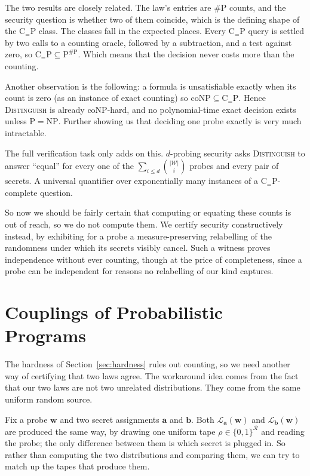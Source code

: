   The two results are closely related. The law's entries are $\#\mathrm{P}$
  counts, and the security question is whether two of them coincide, which is the
  defining shape of the $\mathrm{C}_{=}\mathrm{P}$ class. The classes fall in the expected
  places. Every $\mathrm{C}_{=}\mathrm{P}$ query is settled by two calls to a
  counting oracle, followed by a subtraction, and a test against zero, so
  $\mathrm{C}_{=}\mathrm{P} \subseteq \mathrm{P}^{\#\mathrm{P}}$. Which means
  that the decision never costs more than the counting.

  Another observation is the following: a formula is unsatisfiable exactly when its count is
  zero (as an instance of exact counting) so $\mathrm{coNP} \subseteq
  \mathrm{C}_{=}\mathrm{P}$. Hence \textsc{Distinguish} is already
  $\mathrm{coNP}$-hard, and no polynomial-time exact decision exists unless
  $\mathrm{P} = \mathrm{NP}$. Further showing us that deciding
  one probe exactly is very much intractable.

  The full verification task only adds on this. $d$-probing security asks \textsc{Distinguish}
  to answer ``equal'' for every one of the $\sum_{i \le d} \binom{|\mathcal{W}|}{i}$
  probes and every pair of secrets. A universal quantifier over exponentially many
  instances of a $\mathrm{C}_{=}\mathrm{P}$-complete question.

  So now we should be fairly certain that computing or
  equating these counts is out of reach, so we do not compute them. We certify security
  constructively instead, by exhibiting for a probe a measure-preserving relabelling
  of the randomness under which its secrets visibly cancel. Such a witness proves independence without ever
  counting, though at the price of completeness, since a probe can be independent for
  reasons no relabelling of our kind captures.

\section{Couplings of Probabilistic Programs}
\label{sec:couplings-prob}

The hardness of Section~\ref{sec:hardness} rules out counting, so we need another
way of certifying that two laws agree. The workaround idea comes from the fact that 
our two laws are not two unrelated distributions. They come from the same uniform
random source.

Fix a probe $\mathbf{w}$ and two secret assignments $\mathbf{a}$ and $\mathbf{b}$.
Both $\mathcal{L}_{\mathbf{a}}(\mathbf{w})$ and
$\mathcal{L}_{\mathbf{b}}(\mathbf{w})$ are produced the same way, by drawing one
uniform tape $\rho \in \{0,1\}^{\mathcal{R}}$ and reading the probe; the only
difference between them is which secret is plugged in. So rather than computing the
two distributions and comparing them, we can try to match up the tapes that produce
them.

